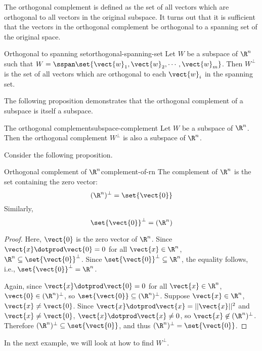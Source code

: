 The orthogonal complement is defined as the set of all vectors which are orthogonal to all vectors in the original subspace. It turns out that it is sufficient that the vectors in the orthogonal complement be orthogonal to a spanning set of the original space.

\begin{proposition}{Orthogonal to spanning set}{orthogonal-spanning-set}
Let $W$ be a subspace of $\R^n$ such that $W = \sspan \set{\vect{w}_1, \vect{w}_2, \cdots, \vect{w}_m }$. Then $W^{\perp}$ is the set of all vectors which are orthogonal to each $\vect{w}_i$ in the spanning set. 
\end{proposition}

The following proposition demonstrates that the orthogonal complement of a subspace is itself a subspace. 

\begin{proposition}{The orthogonal complement}{subspace-complement}
Let $W$ be a subspace of $\R^n$. Then the orthogonal complement $W^{\perp}$ is also a subspace of $\R^n$.
\end{proposition}

Consider the following proposition.

\begin{proposition}{Orthogonal complement of $\R^n$}{complement-of-rn}
The complement of $\R^n$ is the set containing the zero vector:
\[
 (\R^n)^{\perp} = \set{\vect{0} }
\]
Similarly, 
\[
\set{\vect{0} }^{\perp} = (\R^n)
\]
\end{proposition}

\begin{proof}
Here, $\vect{0}$ is the zero vector of $\R^n$.
Since $\vect{x}\dotprod\vect{0}=0$ for all $\vect{x}\in\R^n$, 
$\R^n\subseteq\set{\vect{0}}^{\perp}$.
Since $\set{\vect{0}}^{\perp}\subseteq\R^n$, the equality follows,
i.e., $\set{\vect{0}}^{\perp}=\R^n$.

Again, since $\vect{x}\dotprod\vect{0}=0$ for all $\vect{x}\in\R^n$,
$\vect{0}\in (\R^n)^{\perp}$, so $\set{\vect{0}}\subseteq(\R^n)^{\perp}$.
Suppose $\vect{x}\in\R^n$, $\vect{x}\neq\vect{0}$.  
Since $\vect{x}\dotprod\vect{x}=||\vect{x}||^2$ and $\vect{x}\neq\vect{0}$,
$\vect{x}\dotprod\vect{x}\neq 0$, so $\vect{x}\not\in(\R^n)^{\perp}$.
Therefore $(\R^n)^{\perp}\subseteq \set{\vect{0}}$, and thus
$(\R^n)^{\perp}=\set{\vect{0}}$.
\end{proof}

In the next example, we will look at how to find
$W^{\perp}$.

